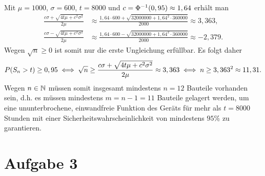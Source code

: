 \documentclass{exercise}
\begin{document}
    Mit \(\mu = 1000\), \(\sigma = 600\), \(t = 8000\) und \(c = \Phi^{-1}\parentheses*{0,95} \approx 1,64\) erhält man
    \begin{align*}
        \frac{c\sigma + \sqrt{4t\mu + c^2 \sigma^2}}{2\mu} &\approx \frac{1,64 \cdot 600 + \sqrt{32000000 + 1,64^2 \cdot 360000}}{2000} \approx 3,363,\\
        \frac{c\sigma - \sqrt{4t\mu + c^2 \sigma^2}}{2\mu} &\approx \frac{1,64 \cdot 600 - \sqrt{32000000 + 1,64^2 \cdot 360000}}{2000} \approx -2,379.
    \end{align*}
    Wegen \(\sqrt{n} \ge 0\) ist somit nur die erste Ungleichung erfüllbar.
    Es folgt daher
    \[
        P\parentheses*{S_n > t} \ge 0,95 \iff \sqrt{n} \ge \frac{c\sigma + \sqrt{4t\mu + c^2 \sigma^2}}{2\mu} \approx 3,363 \iff n \ge 3,363^2 \approx 11,31.
    \]
    Wegen \(n \in \mathbb{N}\) müssen somit insgesamt mindestens \(n = 12\) Bauteile vorhanden sein, d.h. es müssen mindestens \(m = n - 1 = 11\) Bauteile gelagert werden, um eine ununterbrochene, einwandfreie Funktion des Geräts für mehr als \(t = 8000\) Stunden mit einer Sicherheitswahrscheinlichkeit von mindestens \(95\%\) zu garantieren.
    
    
    \section*{Aufgabe 3}
    
\end{document}
